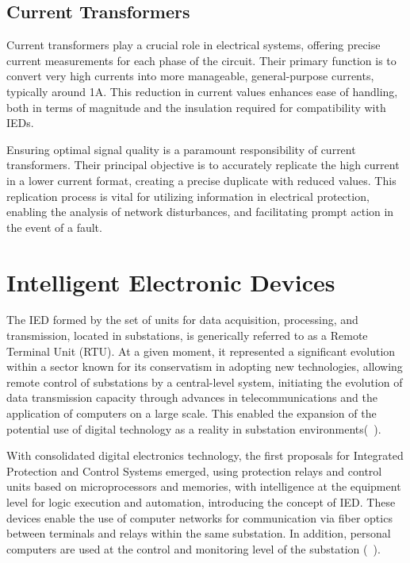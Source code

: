 \subsection{Current Transformers}
Current transformers play a crucial role in electrical systems, offering precise current measurements for each phase of the circuit. Their primary function is to convert very high currents into more manageable, general-purpose currents, typically around 1A. This reduction in current values enhances ease of handling, both in terms of magnitude and the insulation required for compatibility with IEDs.

Ensuring optimal signal quality is a paramount responsibility of current transformers. Their principal objective is to accurately replicate the high current in a lower current format, creating a precise duplicate with reduced values. This replication process is vital for utilizing information in electrical protection, enabling the analysis of network disturbances, and facilitating prompt action in the event of a fault.

\section{Intelligent Electronic Devices}
The IED formed by the set of units for data acquisition, processing, and transmission, located in substations, is generically referred to as a Remote Terminal Unit (RTU). At a given moment, it represented a significant evolution within a sector known for its conservatism in adopting new technologies, allowing remote control of substations by a central-level system, initiating the evolution of data transmission capacity through advances in telecommunications and the application of computers on a large scale. This enabled the expansion of the potential use of digital technology as a reality in substation environments(~\cite{NormaIEC61850}).

With consolidated digital electronics technology, the first proposals for Integrated Protection and Control Systems emerged, using protection relays and control units based on microprocessors and memories, with intelligence at the equipment level for logic execution and automation, introducing the concept of IED. These devices enable the use of computer networks for communication via fiber optics between terminals and relays within the same substation. In addition, personal computers are used at the control and monitoring level of the substation (~\cite{NormaIEC61850}).


